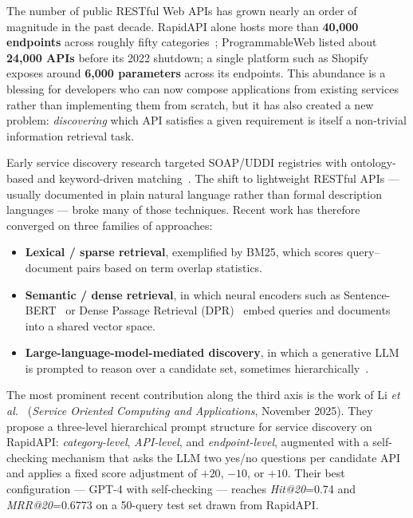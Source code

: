 \documentclass[10pt,a4paper,twocolumn]{article}
\begin{document}
The number of public RESTful Web APIs has grown nearly an order of magnitude
in the past decade. RapidAPI alone hosts more than \textbf{40{,}000
endpoints} across roughly fifty categories~\cite{li2025llm}; ProgrammableWeb
listed about \textbf{24{,}000 APIs} before its 2022 shutdown; a single
platform such as Shopify exposes around \textbf{6{,}000 parameters} across
its endpoints. This abundance is a blessing for developers who can now
compose applications from existing services rather than implementing them
from scratch, but it has also created a new problem: \emph{discovering}
which API satisfies a given requirement is itself a non-trivial information
retrieval task.

Early service discovery research targeted SOAP/UDDI registries with
ontology-based and keyword-driven matching~\cite{paolucci2002,zhou2008}. The
shift to lightweight RESTful APIs --- usually documented in plain natural
language rather than formal description languages --- broke many of those
techniques. Recent work has therefore converged on three families of
approaches:
\begin{itemize}[leftmargin=*]
    \item \textbf{Lexical / sparse retrieval}, exemplified by BM25, which
          scores query--document pairs based on term overlap statistics.
    \item \textbf{Semantic / dense retrieval}, in which neural encoders
          such as Sentence-BERT~\cite{reimers2019sbert} or Dense Passage
          Retrieval (DPR)~\cite{karpukhin2020dpr} embed queries and
          documents into a shared vector space.
    \item \textbf{Large-language-model-mediated discovery}, in which a
          generative LLM~\cite{gpt4tr} is prompted to reason over a
          candidate set, sometimes hierarchically~\cite{li2025llm}.
\end{itemize}

The most prominent recent contribution along the third axis is the work of
Li \textit{et al.}~\cite{li2025llm} (\emph{Service Oriented Computing and
Applications}, November 2025). They propose a three-level hierarchical
prompt structure for service discovery on RapidAPI:
\emph{category-level}, \emph{API-level}, and \emph{endpoint-level},
augmented with a self-checking mechanism that asks the LLM two yes/no
questions per candidate API and applies a fixed score adjustment of
$+20$, $-10$, or $+10$. Their best configuration --- GPT-4 with
self-checking --- reaches \emph{Hit@20}=0.74 and \emph{MRR@20}=0.6773
on a 50-query test set drawn from RapidAPI.
\end{document}
